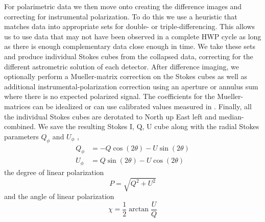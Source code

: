 For polarimetric data we then move onto creating the difference images and correcting for instrumental polarization. To do this we use a heuristic that matches data into appropriate sets for double- or triple-differencing. This allows us to use data that may not have been observed in a complete HWP cycle as long as there is enough complementary data close enough in time. We take these sets and produce individual Stokes cubes from the collapsed data, correcting for the different astrometric solution of each detector. After difference imaging, we optionally perform a Mueller-matrix correction on the Stokes cubes as well as additional instrumental-polarization correction using an aperture or annulus sum where there is no expected polarized signal. The coefficients for the Mueller-matrices can be idealized or can use calibrated values measured in \citet{zhang_characterizing_2023}. Finally, all the individual Stokes cubes are derotated to North up East left and median-combined. We save the resulting Stokes I, Q, U cube along with the radial Stokes parameters $Q_\phi$ and $U_\phi$ \citep{monnier_polarized_2019}, 
\begin{align}
    \label{eqn:radial_stokes}
    Q_\phi &= -Q\cos{\left(2\theta\right)} - U\sin{\left(2\theta\right)} \\
    U_\phi &= Q\sin{\left(2\theta\right)} - U\cos{\left(2\theta\right)}
\end{align}
the degree of linear polarization
\begin{equation}
    P = \sqrt{Q^2 + U^2}
\end{equation}
and the angle of linear polarization
\begin{equation}
    \chi = \frac12\arctan{\frac{U}{Q}}
\end{equation}